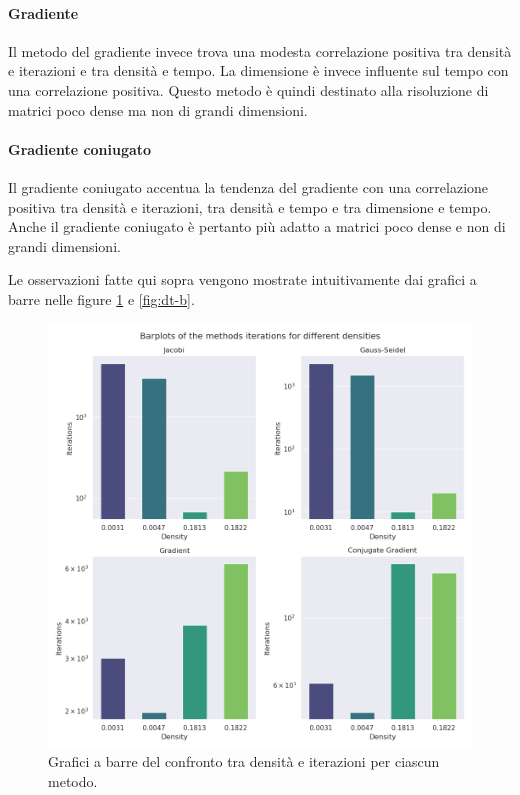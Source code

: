 \documentclass[12pt]{article}
\begin{document}
\paragraph{Gradiente}
Il metodo del gradiente invece trova una modesta correlazione positiva tra densità e iterazioni e tra densità e tempo. La dimensione è invece influente sul tempo con una correlazione positiva. Questo metodo è quindi destinato alla risoluzione di matrici poco dense ma non di grandi dimensioni.

\paragraph{Gradiente coniugato}
Il gradiente coniugato accentua la tendenza del gradiente con una correlazione positiva tra densità e iterazioni, tra densità e tempo e tra dimensione e tempo.
Anche il gradiente coniugato è pertanto più adatto a matrici poco dense e non di grandi dimensioni.

Le osservazioni fatte qui sopra vengono mostrate intuitivamente dai grafici a barre nelle figure \ref{fig:di-b} e \ref{fig:dt-b}.

\begin{figure}[!ht]
    \begin{center}
    \includegraphics[scale=0.6]{images/density-iterations_barplots.png}
    \caption{Grafici a barre del confronto tra densità e iterazioni per ciascun metodo.}
    \label{fig:di-b}
    \end{center}
\end{figure}
\end{document}
